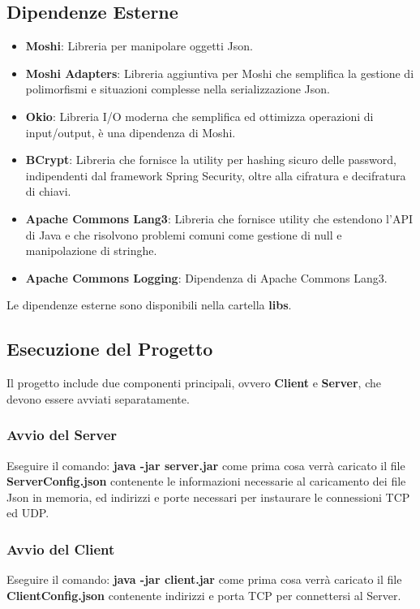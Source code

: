 \documentclass{article}
\begin{document}
\subsection{Dipendenze Esterne}
  \begin{itemize}
    \item \textbf{Moshi}: Libreria per manipolare oggetti Json.
    \item \textbf{Moshi Adapters}: Libreria aggiuntiva per Moshi che semplifica la gestione di polimorfismi e situazioni complesse nella serializzazione Json.
    \item \textbf{Okio}: Libreria I/O moderna che semplifica ed ottimizza operazioni di input/output, è una dipendenza di Moshi.
    \item \textbf{BCrypt}: Libreria che fornisce la utility per hashing sicuro delle password, indipendenti dal framework Spring Security, oltre alla cifratura e decifratura di chiavi.
    \item \textbf{Apache Commons Lang3}: Libreria che fornisce utility che estendono l'API di Java e che risolvono problemi comuni come gestione di null e manipolazione di stringhe.
    \item \textbf{Apache Commons Logging}: Dipendenza di Apache Commons Lang3.
  \end{itemize}
  Le dipendenze esterne sono disponibili nella cartella \textbf{libs}.
\subsection{Esecuzione del Progetto}
Il progetto include due componenti principali, ovvero \textbf{Client} e \textbf{Server}, che devono essere avviati separatamente.

\subsubsection{Avvio del Server}
Eseguire il comando: \textbf{java -jar server.jar}
come prima cosa verrà caricato il file \textbf{ServerConfig.json} contenente 
le informazioni necessarie al caricamento dei file Json in memoria, ed indirizzi e porte necessari per instaurare 
le connessioni TCP ed UDP.

\subsubsection{Avvio del Client}
Eseguire il comando: \textbf{java -jar client.jar}
come prima cosa verrà caricato il file \textbf{ClientConfig.json} contenente indirizzi e porta TCP per connettersi al Server.
\end{document}

